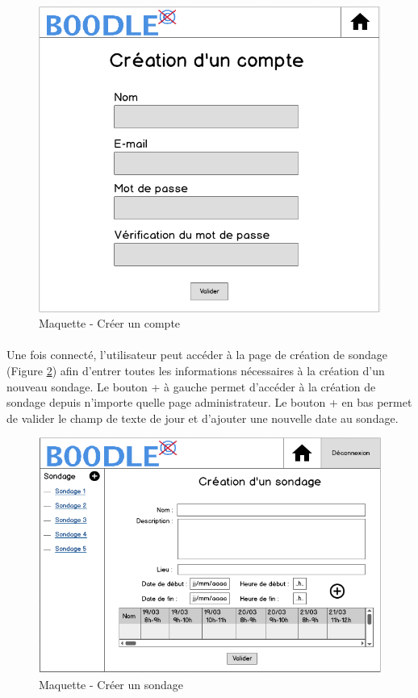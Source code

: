 \documentclass[]{report}
\begin{document}
\begin{figure}[h]
	\caption{Maquette - Créer un compte}
	\label{maquette_creationCompte}
	\centering
	\includegraphics[scale=0.7]{figures/maquettes/creationCompte.png}
\end{figure}

\paragraph{} Une fois connecté, l'utilisateur peut accéder à la page de création de sondage (Figure \ref{maquette_creationEvenement}) afin d'entrer toutes les informations nécessaires à la création d'un nouveau sondage. Le bouton + à gauche permet d'accéder à la création de sondage depuis n'importe quelle page administrateur. Le bouton + en bas permet de valider le champ de texte de jour et d'ajouter une nouvelle date au sondage.

\begin{figure}[h]
	\caption{Maquette - Créer un sondage}
	\label{maquette_creationEvenement}
	\centering
	\includegraphics[scale=0.7]{figures/maquettes/creationEvenement.png}
\end{figure}
\end{document}
